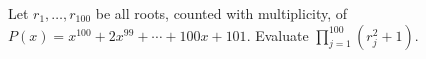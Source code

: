 Let $r_1,\ldots,r_{100}$ be all roots, counted with multiplicity, of $P(x)=x^{100}+2x^{99}+\cdots+100x+101$. Evaluate $\prod_{j=1}^{100}(r_j^2+1)$.
